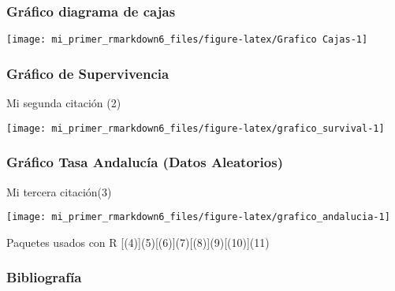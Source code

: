 \documentclass[
]{article}
\begin{document}
\hypertarget{gruxe1fico-diagrama-de-cajas}{%
\subsubsection{Gráfico diagrama de
cajas}\label{gruxe1fico-diagrama-de-cajas}}

\begin{center}\texttt{[image: mi\_primer\_rmarkdown6\_files/figure-latex/Grafico Cajas-1]} \end{center}

\hypertarget{gruxe1fico-de-supervivencia}{%
\subsubsection{Gráfico de
Supervivencia}\label{gruxe1fico-de-supervivencia}}

Mi segunda citación (2)

\begin{center}\texttt{[image: mi\_primer\_rmarkdown6\_files/figure-latex/grafico\_survival-1]} \end{center}

\hypertarget{gruxe1fico-tasa-andalucuxeda-datos-aleatorios}{%
\subsubsection{Gráfico Tasa Andalucía (Datos
Aleatorios)}\label{gruxe1fico-tasa-andalucuxeda-datos-aleatorios}}

Mi tercera citación(3)

\begin{center}\texttt{[image: mi\_primer\_rmarkdown6\_files/figure-latex/grafico\_andalucia-1]} \end{center}

Paquetes usados con R {[}(4){]}(5){[}(6){]}(7){[}(8){]}(9){[}(10){]}(11)

\hypertarget{bibliografuxeda}{%
\subsubsection*{Bibliografía}\label{bibliografuxeda}}
\end{document}
